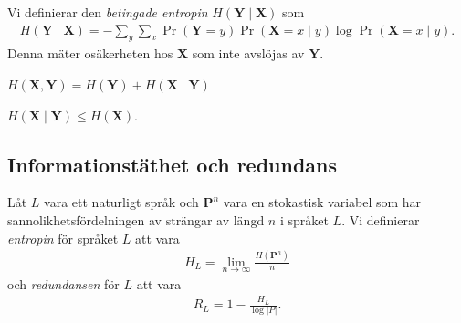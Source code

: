 \documentclass{beamer}
\theoremstyle{definition}
\let\stoch\mathbf{}
\begin{document}
\begin{frame}{\insertsubsectionhead}
  \begin{definition}
    Vi definierar den \emph{betingade entropin} \(H(\stoch Y\mid \stoch X)\) 
    som
    \begin{align*}
      H(\stoch Y\mid \stoch X) = %
        -\sum_y\sum_x \Pr(\stoch Y = y)\Pr(\stoch X = x\mid y)\log \Pr(\stoch 
        X = x\mid y).
    \end{align*}
    Denna mäter osäkerheten hos \(\stoch X\) som inte avslöjas av \(\stoch Y\).
  \end{definition}
\end{frame}

\begin{frame}{\insertsubsectionhead}
  \begin{theorem}
    \(H(\stoch X, \stoch Y) = H(\stoch Y) + H(\stoch X\mid \stoch Y)\)
  \end{theorem}
%
%
  \begin{corollary}
    \(H(\stoch X\mid \stoch Y) \leq H(\stoch X)\).
  \end{corollary}
\end{frame}
%
%

\subsection{Informationstäthet och redundans}

\begin{frame}{\insertsubsectionhead}
  \begin{definition}
    Låt \(L\) vara ett naturligt språk och \(\stoch P^n\) vara en stokastisk 
    variabel som har sannolikhetsfördelningen av strängar av längd \(n\) 
    i språket \(L\).
    Vi definierar \emph{entropin} för språket \(L\) att vara
    \begin{align*}
      H_L = \lim_{n\to \infty}\frac{H(\stoch P^n)}{n}
    \end{align*}
    och \emph{redundansen} för \(L\) att vara
    \begin{align*}
      R_L = 1 - \frac{H_L}{\log |P|}.
    \end{align*}
  \end{definition}
\end{frame}
\end{document}
